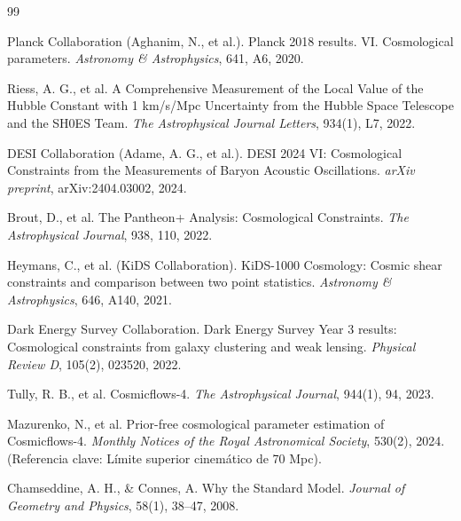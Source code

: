 \documentclass[12pt, a4paper]{article}
\theoremstyle{plain}
\theoremstyle{definition}
\begin{document}
\begin{thebibliography}{99}
\small

Planck Collaboration (Aghanim, N., et al.).
\newblock Planck 2018 results. VI. Cosmological parameters.
\newblock \textit{Astronomy \& Astrophysics}, 641, A6, 2020.

Riess, A. G., et al.
\newblock A Comprehensive Measurement of the Local Value of the Hubble Constant with 1 km/s/Mpc Uncertainty from the Hubble Space Telescope and the SH0ES Team.
\newblock \textit{The Astrophysical Journal Letters}, 934(1), L7, 2022.

DESI Collaboration (Adame, A. G., et al.).
\newblock DESI 2024 VI: Cosmological Constraints from the Measurements of Baryon Acoustic Oscillations.
\newblock \textit{arXiv preprint}, arXiv:2404.03002, 2024.

Brout, D., et al.
\newblock The Pantheon+ Analysis: Cosmological Constraints.
\newblock \textit{The Astrophysical Journal}, 938, 110, 2022.

Heymans, C., et al. (KiDS Collaboration).
\newblock KiDS-1000 Cosmology: Cosmic shear constraints and comparison between two point statistics.
\newblock \textit{Astronomy \& Astrophysics}, 646, A140, 2021.

Dark Energy Survey Collaboration.
\newblock Dark Energy Survey Year 3 results: Cosmological constraints from galaxy clustering and weak lensing.
\newblock \textit{Physical Review D}, 105(2), 023520, 2022.

Tully, R. B., et al.
\newblock Cosmicflows-4.
\newblock \textit{The Astrophysical Journal}, 944(1), 94, 2023.

Mazurenko, N., et al.
\newblock Prior-free cosmological parameter estimation of Cosmicflows-4.
\newblock \textit{Monthly Notices of the Royal Astronomical Society}, 530(2), 2024. 
\newblock (Referencia clave: Límite superior cinemático de 70 Mpc).

Chamseddine, A. H., \& Connes, A.
\newblock Why the Standard Model.
\newblock \textit{Journal of Geometry and Physics}, 58(1), 38–47, 2008.


\end{thebibliography}
\end{document}
